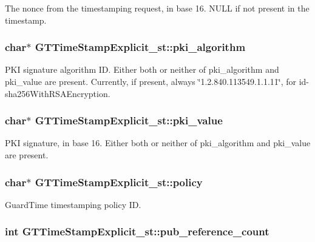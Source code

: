 \label{struct_g_t_time_stamp_explicit__st_a135e613097d30c78572a836d486268be}
The nonce from the timestamping request, in base 16. {\ttfamily NULL} if not present in the timestamp. \hypertarget{struct_g_t_time_stamp_explicit__st_af86dc359e2203e253f648aeee1062369}{
\subsubsection[{pki\_\-algorithm}]{\setlength{\rightskip}{0pt plus 5cm}char$\ast$ {\bf GTTimeStampExplicit\_\-st::pki\_\-algorithm}}}
\label{struct_g_t_time_stamp_explicit__st_af86dc359e2203e253f648aeee1062369}
PKI signature algorithm ID. Either both or neither of pki\_\-algorithm and pki\_\-value are present. Currently, if present, always \char`\"{}1.2.840.113549.1.1.11\char`\"{}, for id-\/sha256WithRSAEncryption. \hypertarget{struct_g_t_time_stamp_explicit__st_a1e93bf6f28e889bb41c1f62baa2da10a}{
\subsubsection[{pki\_\-value}]{\setlength{\rightskip}{0pt plus 5cm}char$\ast$ {\bf GTTimeStampExplicit\_\-st::pki\_\-value}}}
\label{struct_g_t_time_stamp_explicit__st_a1e93bf6f28e889bb41c1f62baa2da10a}
PKI signature, in base 16. Either both or neither of pki\_\-algorithm and pki\_\-value are present. \hypertarget{struct_g_t_time_stamp_explicit__st_a7313bed72669aba2ca9ddd192412ab16}{
\subsubsection[{policy}]{\setlength{\rightskip}{0pt plus 5cm}char$\ast$ {\bf GTTimeStampExplicit\_\-st::policy}}}
\label{struct_g_t_time_stamp_explicit__st_a7313bed72669aba2ca9ddd192412ab16}
GuardTime timestamping policy ID. \hypertarget{struct_g_t_time_stamp_explicit__st_a3906ff3ffd36ebce3243b55c3fe46083}{
\subsubsection[{pub\_\-reference\_\-count}]{\setlength{\rightskip}{0pt plus 5cm}int {\bf GTTimeStampExplicit\_\-st::pub\_\-reference\_\-count}}}
